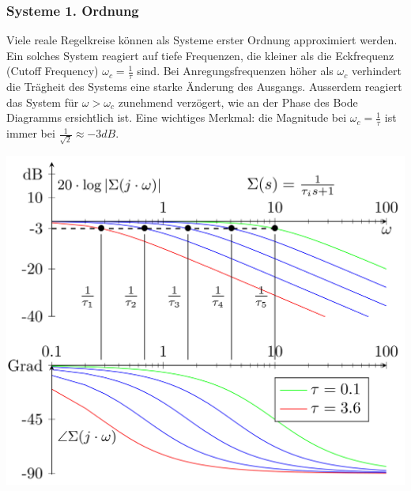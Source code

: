         \subsubsection{Systeme 1. Ordnung}
            Viele reale Regelkreise können als Systeme erster Ordnung approximiert werden. Ein solches System reagiert auf tiefe Frequenzen, die kleiner als die Eckfrequenz (Cutoff Frequency) $\omega_c = \frac{1}{\tau}$ sind. Bei Anregungsfrequenzen höher als $\omega_c$ verhindert die Trägheit des Systems eine starke Änderung des Ausgangs. Ausserdem reagiert das System für $\omega > \omega_c$ zunehmend verzögert, wie an der Phase des Bode Diagramms ersichtlich ist. Eine wichtiges Merkmal: die Magnitude bei $\omega_c = \frac{1}{\tau}$ ist immer bei $\frac{1}{\sqrt{2}}\approx -3 dB.$
            \begin{center}
                \includegraphics[width = 0.8\linewidth]{images/05/Bode_1Ordnung.png}
            \end{center}
